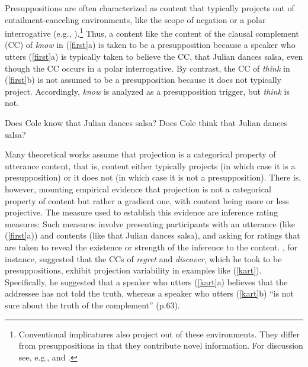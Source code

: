 \documentclass[11pt,fleqn]{article}
\newcommand{\6}{\mbox{$[\hspace*{-.6mm}[$}}
\newcommand{\9}{\mbox{$]\hspace*{-.6mm}]$}}
\begin{document}
Presuppositions are often characterized as content that typically projects out of entailment-canceling environments, like the scope of negation or a polar interrogative (e.g., \citealt{ccmg90}).\footnote{Conventional implicatures also project out of these environments. They differ from presuppositions in that they contribute novel information. For discussion see, e.g., \citealt{ccmg90} and \citealt{potts05}.} Thus, a content like the content of the clausal complement (CC) of {\em know} in (\ref{first}a) is taken to be a presupposition because a speaker who utters (\ref{first}a) is typically taken to believe the CC, that Julian dances salsa, even though the CC occurs in a polar interrogative. By contrast, the CC of {\em think} in (\ref{first}b) is not assumed to be a presupposition because it does not typically project. Accordingly, {\em know} is analyzed as a presupposition trigger, but {\em think} is not.

\begin{exe}
\ex\label{first} 
\begin{xlist}
\ex Does Cole know that Julian dances salsa?
\ex Does Cole think that Julian dances salsa?
\end{xlist}
\end{exe}

Many theoretical works assume that projection is a categorical property of utterance content, that is, content either typically projects (in which case it is a presupposition) or it does not (in which case it is not a presupposition). There is, however, mounting empirical evidence that projection is not a categorical property of  content but rather a gradient one, with content being more or less projective. The measure used to establish this evidence are inference rating measures: Such measures involve presenting participants with an utterance (like (\ref{first}a)) and contents (like that Julian dances salsa), and asking for ratings that are taken to reveal the existence or strength of the inference to the content. \citealt{karttunen71b}, for instance, suggested that the CCs of {\em regret} and {\em discover}, which he took to be presuppositions, exhibit projection variability in examples like (\ref{kart}). Specifically, he suggested that a speaker who utters (\ref{kart}a) believes that the addressee has not told the truth, whereas a speaker who utters (\ref{kart}b) ``is not sure about the truth of the complement'' (p.63).
\end{document}
